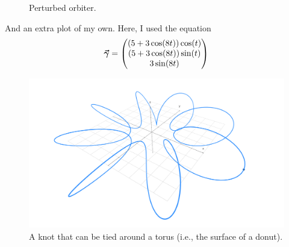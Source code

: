 \documentclass[12pt]{article} %
\begin{document}
\begin{solution}
\begin{enumerate}[(a)]
\begin{figure}[H]
        \caption{Perturbed orbiter.}
    \end{figure}
\end{enumerate}
And an extra plot of my own. Here, I used the equation
\[
\boldsymbol{\vec{\gamma}} = \begin{pmatrix} (5+3\cos(8t))\cos(t) \\ (5+3\cos(8t))\sin(t) \\ 3\sin(8t) \end{pmatrix}
\]
\begin{figure}[H]
    \centering
    \includegraphics[width=.6\textwidth]{Images/torus_knot.png}
    \caption{A knot that can be tied around a torus (i.e., the surface of a donut).}
\end{figure}
\end{solution}
\end{document}
